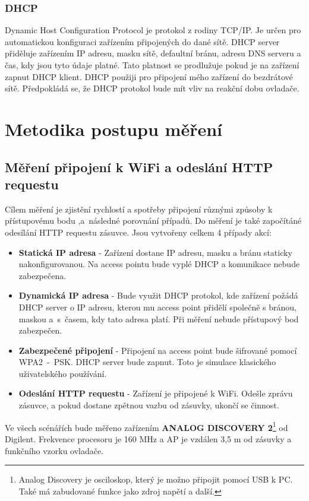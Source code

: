 \documentclass[a4paper, 12pt]{report}
\begin{document}
    \subsection{DHCP}
    Dynamic Host Configuration Protocol je protokol z rodiny TCP/IP. Je určen pro automatickou konfiguraci zařízením připojených do dané sítě.
    DHCP server přiděluje zařízením IP adresu, masku sítě, defaultní bránu, adresu DNS serveru a čas, kdy jsou tyto údaje platné.
    Tato platnost se prodlužuje pokud je na zařízení zapnut DHCP klient.
    DHCP použiji pro připojení mého zařízení do bezdrátové sítě.
    Předpokládá se, že DHCP protokol bude mít vliv na reakční dobu ovladače.


    \chapter{Metodika postupu měření}
    \section{Měření připojení k WiFi a odeslání HTTP requestu}
    \label{sec:wifi}
    Cílem měření je zjistění rychlostí a spotřeby připojení různými způsoby k přístupovému bodu ,a~následné porovnání případů.
    Do měření je také započítáné odesílání HTTP requestu zásuvce.
    Jsou vytvořeny celkem 4 případy akcí:
    \begin{itemize}
        \item \textbf{Statická IP adresa} - Zařízení dostane IP adresu, masku a bránu staticky nakonfigurovanou.
        Na access pointu bude vyplé DHCP a komunikace nebude zabezpečena.
        \item \textbf{Dynamická IP adresa} - Bude využit DHCP protokol, kde zařízení požádá DHCP server o IP adresu, kterou mu access point přidělí společně s bránou, maskou a~s~časem, kdy tato adresa platí.
        Při měření nebude přístupový bod zabezpečen.
        \item \textbf{Zabezpečené připojení} - Připojení na access point bude šifrované pomocí WPA2~-~PSK. DHCP server bude zapnut.
        Toto je simulace klasického uživatelského používání.
        \item \textbf{Odeslání HTTP requestu} - Zařízení je připojené k WiFi. Odešle zprávu zásuvce, a pokud dostane zpětnou vazbu od zásuvky, ukončí se činnost.
    \end{itemize}
    Ve všech scénářích bude měřeno zařízením \textbf{ANALOG DISCOVERY 2}\footnote{Analog Discovery je osciloskop, který je možno připojit pomocí USB k PC. Také má zabudované funkce jako zdroj napětí a další.} od Digilent.
    Frekvence procesoru je 160 \si{MHz} a AP je vzdálen 3,5 \si{m} od zásuvky a funkčního vzorku ovladače.
\end{document}

